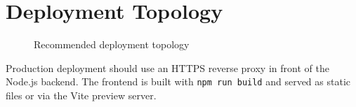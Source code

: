 \section{Deployment Topology}
\label{sec:deployment}

\begin{figure}[H]
  \centering
  \caption{Recommended deployment topology}
  \label{fig:deployment}
\end{figure}

Production deployment should use an HTTPS reverse proxy in front of the Node.js backend. The frontend is built with \texttt{npm run build} and served as static files or via the Vite preview server.

